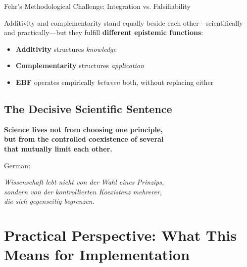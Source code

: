 \begin{chapter}{Fehr's Methodological Challenge: Integration vs. Falsifiability}
\begin{tcolorbox}[colback=green!5!white,colframe=green!75!black]
Additivity and complementarity stand equally beside each other---scientifically and practically---but they fulfill \textbf{different epistemic functions}:

\begin{itemize}[noitemsep]
    \item \textbf{Additivity} structures \textit{knowledge}
    \item \textbf{Complementarity} structures \textit{application}
    \item \textbf{EBF} operates empirically \textit{between} both, without replacing either
\end{itemize}
\end{tcolorbox}

\subsection{The Decisive Scientific Sentence}

\begin{tcolorbox}[colback=red!10!white,colframe=red!75!black,title=\textbf{The Concluding Statement of This Appendix}]
\begin{center}
\Large
\textbf{Science lives not from choosing one principle,\\
but from the controlled coexistence of several\\
that mutually limit each other.}
\end{center}

\vspace{0.5em}
\normalsize
German:

\begin{center}
\textit{Wissenschaft lebt nicht von der Wahl eines Prinzips,\\
sondern von der kontrollierten Koexistenz mehrerer,\\
die sich gegenseitig begrenzen.}
\end{center}
\end{tcolorbox}


\section{Practical Perspective: What This Means for Implementation}
\label{sec:practical}


\end{chapter}
